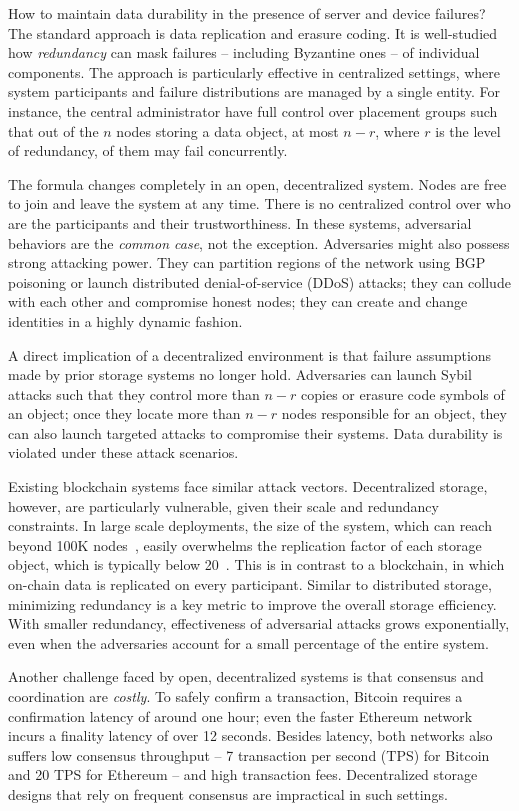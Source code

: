 How to maintain data durability in the presence of server and device failures?
The standard approach is data replication and erasure coding.
It is well-studied how \emph{redundancy} can mask failures -- including Byzantine ones -- of individual components.
The approach is particularly effective in centralized settings, where system participants and failure distributions are managed by a single entity.
For instance, the central administrator have full control over placement groups such that out of the $n$ nodes storing a data object, at most $n-r$, where $r$ is the level of redundancy, of them may fail concurrently.

The formula changes completely in an open, decentralized system.
Nodes are free to join and leave the system at any time.
There is no centralized control over who are the participants and their trustworthiness.
In these systems, adversarial behaviors are the \emph{common case}, not the exception.
Adversaries might also possess strong attacking power.
They can partition regions of the network using BGP poisoning or launch distributed denial-of-service (DDoS) attacks;
they can collude with each other and compromise honest nodes;
they can create and change identities in a highly dynamic fashion.

A direct implication of a decentralized environment is that failure assumptions made by prior storage systems no longer hold.
Adversaries can launch Sybil attacks such that they control more than $n-r$ copies or erasure code symbols of an object;
once they locate more than $n-r$ nodes responsible for an object, they can also launch targeted attacks to compromise their systems.
Data durability is violated under these attack scenarios.

Existing blockchain systems face similar attack vectors.
Decentralized storage, however, are particularly vulnerable, given their scale and redundancy constraints.
In large scale deployments, the size of the system, which can reach beyond 100K nodes~\cite{ipfs}, easily overwhelms the replication factor of each storage object, which is typically below 20~\cite{kademlia}.
This is in contrast to a blockchain, in which on-chain data is replicated on every participant.
Similar to distributed storage, minimizing redundancy is a key metric to improve the overall storage efficiency.
With smaller redundancy, effectiveness of adversarial attacks grows exponentially, even when the adversaries account for a small percentage of the entire system.

Another challenge faced by open, decentralized systems is that consensus and coordination are \emph{costly}.
To safely confirm a transaction, Bitcoin requires a confirmation latency of around one hour;
even the faster Ethereum network incurs a finality latency of over 12 seconds.
Besides latency, both networks also suffers low consensus throughput -- 7 transaction per second (TPS) for Bitcoin and 20 TPS for Ethereum -- and high transaction fees.
Decentralized storage designs that rely on frequent consensus are impractical in such settings.

